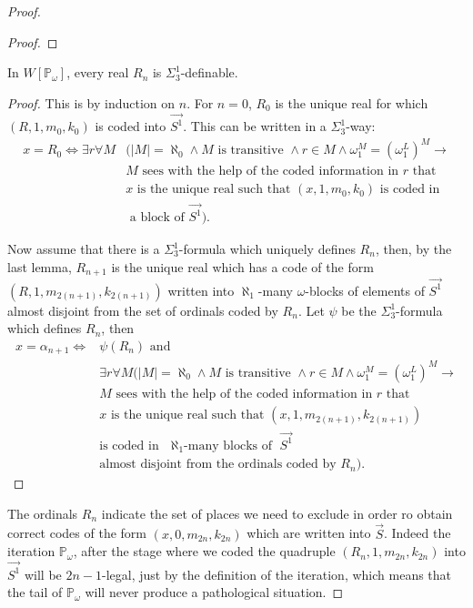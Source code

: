 \documentclass[10pt,a4paper]{amsart}
\newcommand{\forceP}{\mathbb{P}}
\begin{document}
\begin{proof}
\begin{proof}
\end{proof}
\begin{lemma}
In $W[\forceP_{\omega}]$, every real  $R_{n}$ is $\Sigma^1_3$-definable.
\end{lemma}
\begin{proof}
This is by induction on $n$. For $n=0$, $R_0$ is the unique real  for which $(R,1,m_0,k_0)$ is coded into $\vec{S^1}$.
This can be written in a $\Sigma^1_3$-way:
\begin{align*}
x= R_0 \Leftrightarrow \exists r \forall M &(|M|=\aleph_0 \land M \text{ is transitive } \land r \in M \land \omega_1^M=(\omega_1^L)^M \rightarrow \\&M \text{ sees with the help of the coded information in } r \text{ that }\\& x \text{ is the unique real such that } (x,1,m_0,k_0) \text{ is coded in} \\& \text{ a block of } \vec{S^1}).
\end{align*}

Now assume that there is a $\Sigma ^1_3$-formula which uniquely defines $R_{n}$, then, by the last lemma, $R_{n+1}$ is the unique real which has a code of the form $(R,1,m_{2(n+1)},k_{2(n+1)})$ written into $\aleph_1$-many $\omega$-blocks of elements of $\vec{S^1}$ almost disjoint from the set of ordinals coded by $R_n$. Let $\psi$ be the $\Sigma^1_3$-formula which defines $R_{n}$, then
\begin{align*}
x= \alpha_{n+1} \Leftrightarrow  &\psi(R_{n}) \text{ and } \\ &\exists r \forall M (|M|=\aleph_0 \land M \text{ is transitive } \land r \in M \land \omega_1^M=(\omega_1^L)^M \rightarrow \\&M \text{ sees with the help of the coded information in } r \text{ that }\\& x \text{ is the unique real such that } (x,1,m_{2(n+1)},k_{2(n+1)}) \\& \text{is coded in} \text{ $\aleph_1$-many blocks of } \vec{S^1} \\& \text{almost disjoint from the ordinals coded by }  R_{n}).
\end{align*}

\end{proof}
The ordinals $R_{n}$ indicate the set of places we need to exclude in order ro obtain correct codes of the form $(x,0,m_{2n},k_{2n})$ which are written into $\vec{S}$. Indeed the iteration $\forceP_{\omega}$, after the stage where we coded the quadruple $(R_{n},1,m_{2n},k_{2n})$ into $\vec{S^1}$ will be $2n-1$-legal, just by the definition of the iteration, which means that the tail of $\forceP_{\omega}$ will never produce a pathological situation.


\end{proof}
\end{document}
